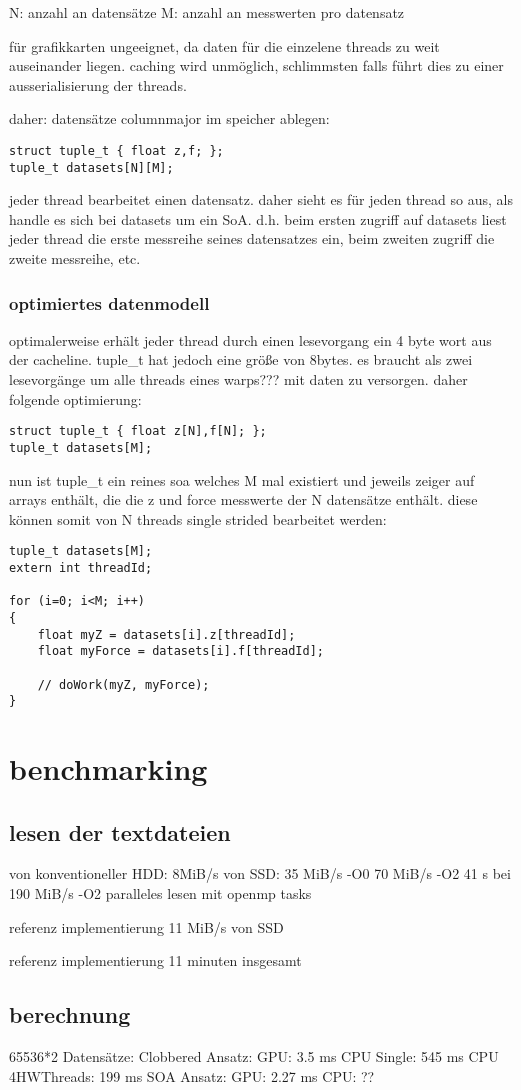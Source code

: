 N: anzahl an datensätze
M: anzahl an messwerten pro datensatz

für grafikkarten ungeeignet, da daten für die einzelene threads zu weit auseinander liegen. caching wird unmöglich, schlimmsten falls führt dies zu einer ausserialisierung der threads.

daher: datensätze columnmajor im speicher ablegen:

\begin{lstlisting}
struct tuple_t { float z,f; };
tuple_t datasets[N][M];
\end{lstlisting}

jeder thread bearbeitet einen datensatz. daher sieht es für jeden thread so aus, als handle es sich bei datasets um ein SoA. d.h. beim ersten zugriff auf datasets liest jeder thread die erste messreihe seines datensatzes ein, beim zweiten zugriff die zweite messreihe, etc.

\subsection{optimiertes datenmodell}
optimalerweise erhält jeder thread durch einen lesevorgang ein 4 byte wort aus der cacheline. tuple_t hat jedoch eine größe von 8bytes. es braucht als zwei lesevorgänge um alle threads eines warps??? mit daten zu versorgen.
daher folgende optimierung:

\begin{lstlisting}
struct tuple_t { float z[N],f[N]; };
tuple_t datasets[M];
\end{lstlisting}

nun ist tuple_t ein reines soa welches M mal existiert und jeweils zeiger auf arrays enthält, die die z und force messwerte der N datensätze enthält. diese können somit von N threads single strided bearbeitet werden:

\begin{lstlisting}
tuple_t datasets[M];
extern int threadId;

for (i=0; i<M; i++)
{
    float myZ = datasets[i].z[threadId];
    float myForce = datasets[i].f[threadId];
    
    // doWork(myZ, myForce);
}
\end{lstlisting}

\chapter{benchmarking}
\section{lesen der textdateien}
von konventioneller HDD: 8MiB/s
von SSD:  35 MiB/s -O0
70 MiB/s -O2
41 s bei 190 MiB/s -O2 paralleles lesen mit openmp tasks

referenz implementierung 11 MiB/s von SSD

referenz implementierung 11 minuten insgesamt

\section{berechnung}
65536*2 Datensätze:
Clobbered Ansatz: GPU: 3.5 ms CPU Single: 545 ms CPU 4HWThreads: 199 ms
SOA Ansatz: GPU: 2.27 ms CPU: ??

